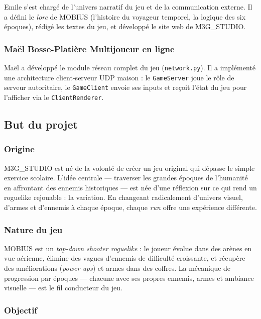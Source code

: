 \documentclass[12pt,a4paper]{article}
\begin{document}
Emile s'est chargé de l'univers narratif du jeu et de la communication externe. Il a défini le \textit{lore} de MOBIUS (l'histoire du voyageur temporel, la logique des six époques), rédigé les textes du jeu, et développé le site web de M3G\_STUDIO.

\subsubsection*{Maël Bosse-Platière \textemdash{} Multijoueur en ligne}

Maël a développé le module réseau complet du jeu (\texttt{network.py}). Il a implémenté une architecture client-serveur UDP maison : le \texttt{GameServer} joue le rôle de serveur autoritaire, le \texttt{GameClient} envoie ses inputs et reçoit l'état du jeu pour l'afficher via le \texttt{ClientRenderer}.

\subsection{But du projet}

\subsubsection*{Origine}

M3G\_STUDIO est né de la volonté de créer un jeu original qui dépasse le simple exercice scolaire. L'idée centrale --- traverser les grandes époques de l'humanité en affrontant des ennemis historiques --- est née d'une réflexion sur ce qui rend un roguelike rejouable : la variation. En changeant radicalement d'univers visuel, d'armes et d'ennemis à chaque époque, chaque \textit{run} offre une expérience différente.

\subsubsection*{Nature du jeu}

MOBIUS est un \textit{top-down shooter roguelike} : le joueur évolue dans des arènes en vue aérienne, élimine des vagues d'ennemis de difficulté croissante, et récupère des améliorations (\textit{power-ups}) et armes dans des coffres. La mécanique de progression par époques --- chacune avec ses propres ennemis, armes et ambiance visuelle --- est le fil conducteur du jeu.

\subsubsection*{Objectif}
\end{document}
